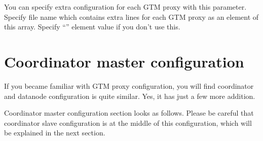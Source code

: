   
      You can specify extra configuration for each GTM proxy with this parameter.
      Specify file name which contains extra  lines for each GTM proxy as
	  an element of this array.
      Specify ``'' element value if you don't use this.



\section{\label{pgxcCtl:coordMasterConf}Coordinator master configuration}

  If you became familiar with GTM proxy configuration, you will find coordinator and datanode
  configuration is quite similar.
  Yes, it has just a few more addition.
  
  Coordinator master configuration section looks as follows.
  Please be careful that coordinator slave configuration is at the middle of this configuration,
  which will be explained in the next section.
  
